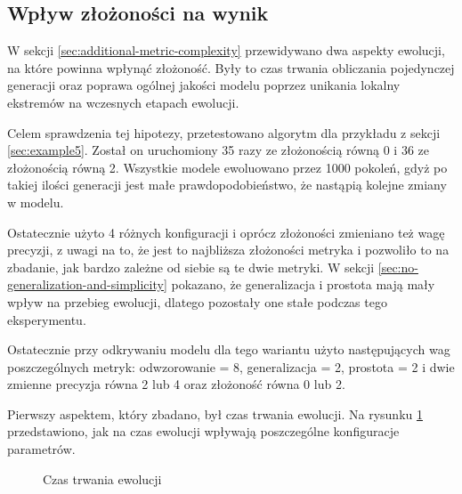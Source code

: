 \subsection{Wpływ złożoności na wynik}
W sekcji \ref{sec:additional-metric-complexity} przewidywano dwa aspekty ewolucji, na które powinna wpłynąć złożoność. Były to czas trwania obliczania pojedynczej generacji oraz poprawa ogólnej jakości modelu poprzez unikania lokalny ekstremów na wczesnych etapach ewolucji. 

Celem sprawdzenia tej hipotezy, przetestowano algorytm dla przykładu z sekcji \ref{sec:example5}. Został on  uruchomiony 35 razy ze złożonością równą 0 i 36 ze złożonością równą 2. Wszystkie modele ewoluowano przez 1000 pokoleń, gdyż po takiej ilości generacji jest małe prawdopodobieństwo, że nastąpią kolejne zmiany w modelu. 

Ostatecznie użyto 4 różnych konfiguracji i oprócz złożoności zmieniano też wagę precyzji, z uwagi na to, że jest to najbliższa złożoności metryka i pozwoliło to na zbadanie, jak bardzo zależne od siebie są te dwie metryki. W sekcji \ref{sec:no-generalization-and-simplicity} pokazano, że generalizacja i prostota mają mały wpływ na przebieg ewolucji, dlatego pozostały one stałe podczas tego eksperymentu.

Ostatecznie przy odkrywaniu modelu dla tego wariantu użyto następujących wag poszczególnych metryk: odwzorowanie = 8, generalizacja = 2, prostota = 2 i dwie zmienne precyzja równa 2 lub 4 oraz złożoność równa 0 lub 2. 

Pierwszy aspektem, który zbadano, był czas trwania ewolucji. Na rysunku \ref{fig:total_timemulti4} przedstawiono, jak na czas ewolucji wpływają poszczególne konfiguracje parametrów.  

\begin{figure}[H]
	\caption{\label{fig:total_timemulti4}Czas trwania ewolucji}
\end{figure}

